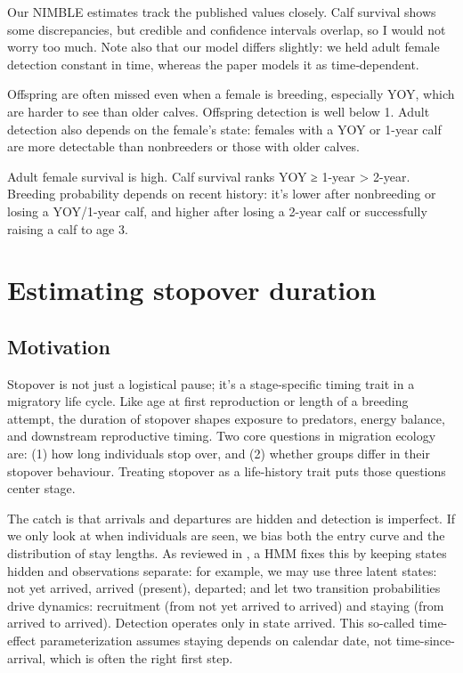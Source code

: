 \documentclass[
  12pt,
]{krantz}
\begin{document}
Our NIMBLE estimates track the published values closely. Calf survival shows some discrepancies, but credible and confidence intervals overlap, so I would not worry too much. Note also that our model differs slightly: we held adult female detection constant in time, whereas the paper models it as time‐dependent.

Offspring are often missed even when a female is breeding, especially YOY, which are harder to see than older calves. Offspring detection is well below 1. Adult detection also depends on the female's state: females with a YOY or 1-year calf are more detectable than nonbreeders or those with older calves.

Adult female survival is high. Calf survival ranks YOY ≥ 1-year \textgreater{} 2-year. Breeding probability depends on recent history: it's lower after nonbreeding or losing a YOY/1-year calf, and higher after losing a 2-year calf or successfully raising a calf to age 3.

\section{Estimating stopover duration}\label{estimating-stopover-duration}

\subsection{Motivation}\label{motivation-8}

Stopover is not just a logistical pause; it's a stage-specific timing trait in a migratory life cycle. Like age at first reproduction or length of a breeding attempt, the duration of stopover shapes exposure to predators, energy balance, and downstream reproductive timing. Two core questions in migration ecology are: (1) how long individuals stop over, and (2) whether groups differ in their stopover behaviour. Treating stopover as a life-history trait puts those questions center stage.

The catch is that arrivals and departures are hidden and detection is imperfect. If we only look at when individuals are seen, we bias both the entry curve and the distribution of stay lengths. As reviewed in \citet{guerin_advances_2017}, a HMM fixes this by keeping states hidden and observations separate: for example, we may use three latent states: not yet arrived, arrived (present), departed; and let two transition probabilities drive dynamics: recruitment (from not yet arrived to arrived) and staying (from arrived to arrived). Detection operates only in state arrived. This so-called time-effect parameterization assumes staying depends on calendar date, not time-since-arrival, which is often the right first step.
\end{document}
